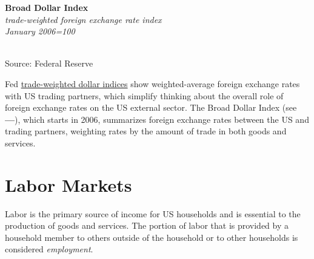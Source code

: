 \documentclass{report}
\makeatletter
\newcommand{\tbllink}[1]{\href{https://raw.githubusercontent.com/bdecon/US-chartbook/master/chartbook/data/#1}{\faTable}}
\newcommand*\short[1]{\expandafter\@gobbletwo\number\numexpr#1\relax}
\newcommand{\dateaxisticks}{
		date coordinates in=x, axis line style={draw=none},
		xmax={2020-05-10},
		max space between ticks=40,	    
		xtick={{1990-01-01}, {1992-01-01}, {1994-01-01}, 
			{1996-01-01}, {1998-01-01}, {2000-01-01}, 
			{2002-01-01}, {2004-01-01}, {2006-01-01},
			{2008-01-01}, {2010-01-01}, {2012-01-01}, {2014-01-01},
		    {2016-01-01}, {2018-01-01}, {2020-01-01}},
		minor xtick={{1989-01-01}, {1991-01-01}, {1993-01-01},
			{1995-01-01}, {1997-01-01}, {1999-01-01}, 
			{2001-01-01}, {2003-01-01}, {2005-01-01}, {2007-01-01},
		    {2009-01-01}, {2011-01-01}, {2013-01-01}, {2015-01-01},
		    {2017-01-01}, {2019-01-01}},
		enlarge y limits={0.06}, enlarge x limits={0.01},
		}
\newcommand{\bbar}[2]{extra #1 ticks = {{#2}}, extra #1 tick labels = ,
		extra #1 tick style = {grid=major, grid style={thick, black!25}},}
\newcommand{\stdline}[4]{\addplot[very thick, no markers, color=#1] 
		table [x=#2, y=#3, col sep=comma] {#4};	}
\newcommand{\rbars}{
		\fill[color=black!10] (axis cs:{1990-07-01},\pgfkeysvalueof{/pgfplots/ymin}) rectangle 
			(axis cs:{1991-03-01}, \pgfkeysvalueof{/pgfplots/ymax});
		\fill[color=black!10] (axis cs:{2007-12-01},\pgfkeysvalueof{/pgfplots/ymin}) rectangle 
			(axis cs:{2009-07-01}, \pgfkeysvalueof{/pgfplots/ymax});
		\fill[color=black!10] (axis cs:{2001-03-01},\pgfkeysvalueof{/pgfplots/ymin}) rectangle 
			(axis cs:{2001-11-01}, \pgfkeysvalueof{/pgfplots/ymax});}
\makeatother
\begin{document}
{{{{{{{\vspace{4mm}
\begin{minipage}{0.33\textwidth}
\noindent \normalsize \textbf{Broad Dollar Index}\\
\footnotesize{\textit{trade-weighted foreign exchange rate index}}\\
\footnotesize{\textit{January 2006=100}}\\
\noindent \hspace*{-2mm} \\
\footnotesize{Source: Federal Reserve} \hspace{16mm} \tbllink{fx_idx.csv}
\end{minipage}\hspace{4mm}
\begin{minipage}{0.4\textwidth}
\small Fed \href{https://www.federalreserve.gov/releases/h10/summary/default.htm}{trade-weighted dollar indices} show weighted-average foreign exchange rates with US trading partners, which simplify thinking about the overall role of foreign exchange rates on the US external sector. The Broad Dollar Index (see {\color{blue!60!black}\textbf{---}}), which starts in 2006, summarizes foreign exchange rates between the US and trading partners, weighting rates by the amount of trade in both goods and services.\\


\end{minipage}

\newpage
\section*{\color{darkgray}\LARGE \seriffont Labor Markets}
\label{sec:lab}

\begin{minipage}{0.34\textwidth}
\small Labor is the primary source of income for US households and is essential to the production of goods and services. The portion of labor that is provided by a household member to others outside of the household or to other households is considered \textit{employment}. \\


\end{minipage}}}}}}}}
\end{document}
